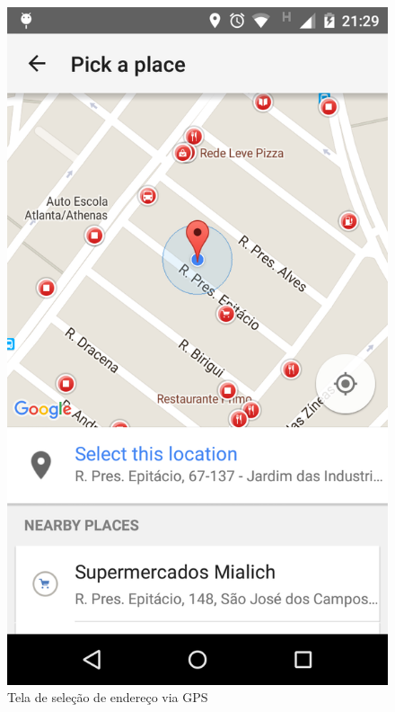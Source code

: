 \documentclass[
	article,			%
	11pt,				%
	oneside,			%
	a4paper,			%
	english,			%
	brazil,				%
	sumario=tradicional
	]{abntex2}
\begin{document}
\begin{figure}[!htbp]
\begin{minipage}{0.4\textwidth}
  \end{minipage}
  \hfill
  \begin{minipage}{0.4\textwidth}
    \centering
    \caption{\label{android-tela-gps}Tela de seleção de endereço via GPS}
    \includegraphics[scale=0.1]{android/4.png}
  \end{minipage}
\end{figure}
\end{document}
